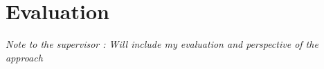 \chapter{Evaluation}
\textit{Note to the supervisor : Will include my evaluation and perspective of the approach}